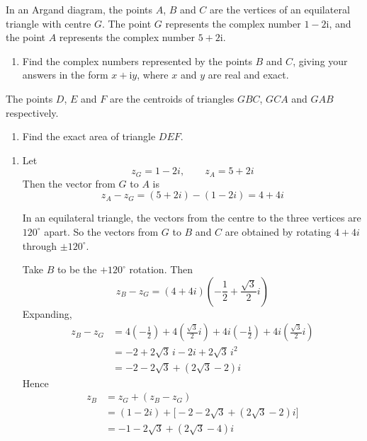 \documentclass[leqno]{article}
\begin{document}
\begin{enumerate}[
  label=\textbf{\arabic*.},
  leftmargin=*,
  topsep=0pt,
  partopsep=0pt,
  parsep=0pt
]
In an Argand diagram, the points $A$, $B$ and $C$ are the vertices of an equilateral triangle with centre $G$. The point $G$ represents the complex number $1-2\mathrm{i}$, and the point $A$ represents the complex number $5+2\mathrm{i}$. \\
\begin{enumerate}[label=\textbf{(\alph*)}]
  \item Find the complex numbers represented by the points $B$ and $C$, giving your answers in the form $x+\mathrm{i}y$, where $x$ and $y$ are real and exact.  \\
\end{enumerate}
The points $D$, $E$ and $F$ are the centroids of triangles $GBC$, $GCA$ and $GAB$ respectively. \\
\begin{enumerate}[label=\textbf{(\alph*)}, resume]
  \item Find the exact area of triangle $DEF$.  \\
\end{enumerate}

\vspace*{30pt}

\begin{tcolorbox}[colback=white, colframe=scarlet, title={\textbf{Solution}}, breakable, grow to left by=6mm, grow to right by=10mm]
\begin{enumerate}[label=\textbf{(\alph*)}]
  \item Let
  \[
  z_G=1-2i,\qquad z_A=5+2i
  \]
  Then the vector from \(G\) to \(A\) is
  \[
  z_A-z_G=(5+2i)-(1-2i)=4+4i
  \]

  In an equilateral triangle, the vectors from the centre to the three vertices are \(120^\circ\) apart. So the vectors from \(G\) to \(B\) and \(C\) are obtained by rotating \(4+4i\) through \(\pm 120^\circ\).

  Take \(B\) to be the \(+120^\circ\) rotation. Then
  \[
  z_B-z_G=(4+4i)\left(-\frac12+\frac{\sqrt3}{2}i\right)
  \]
  Expanding,
  \begin{align*}
  z_B-z_G
  &=4\left(-\frac12\right)+4\left(\frac{\sqrt3}{2}i\right)+4i\left(-\frac12\right)+4i\left(\frac{\sqrt3}{2}i\right) \\
  &=-2+2\sqrt3\,i-2i+2\sqrt3\,i^2 \\
  &=-2-2\sqrt3+(2\sqrt3-2)i
  \end{align*}
  Hence
  \begin{align*}
  z_B&=z_G+(z_B-z_G) \\
  &=(1-2i)+\bigl[-2-2\sqrt3+(2\sqrt3-2)i\bigr] \\
  &=-1-2\sqrt3+(2\sqrt3-4)i
  \end{align*}


\end{enumerate}
\end{tcolorbox}
\end{enumerate}
\end{document}
